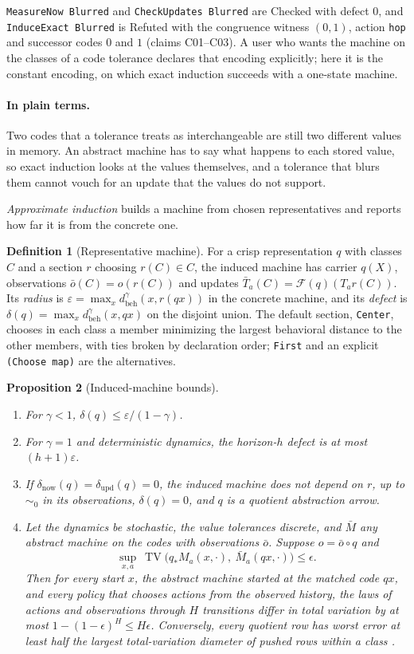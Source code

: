 \documentclass[11pt]{article}
\newcommand{\code}[1]{\texttt{#1}}
\newcommand{\TV}{\operatorname{TV}}
\newcommand{\dnow}{\delta_{\mathrm{now}}}
\newcommand{\dupd}{\delta_{\mathrm{upd}}}
\newcommand{\dbeh}{d_{\mathrm{beh}}}
\newcommand{\plain}{\paragraph{In plain terms.}}
\theoremstyle{definition}
\newtheorem{definition}{Definition}[section]
\theoremstyle{plain}
\newtheorem{proposition}[definition]{Proposition}
\begin{document}
\code{MeasureNow Blurred} and \code{CheckUpdates Blurred} are Checked with defect $0$, and
\code{InduceExact Blurred} is Refuted with the congruence witness $(0,1)$, action \code{hop} and
successor codes $0$ and $1$ (claims C01--C03). A user who wants the machine on the classes of a code
tolerance declares that encoding explicitly; here it is the constant encoding, on which exact
induction succeeds with a one-state machine.

\plain Two codes that a tolerance treats as interchangeable are still two different values in
memory. An abstract machine has to say what happens to each stored value, so exact induction looks
at the values themselves, and a tolerance that blurs them cannot vouch for an update that the values
do not support.

\emph{Approximate induction} builds a machine from chosen representatives and reports how far it
is from the concrete one.

\begin{definition}[Representative machine]\label{def:repmachine}
For a crisp representation $q$ with classes $C$ and a section $r$ choosing $r(C)\in C$, the
induced machine has carrier $q(X)$, observations $\bar o(C)=o(r(C))$ and updates
$\bar T_a(C)=\mathcal F(q)(T_a r(C))$. Its \emph{radius} is
$\varepsilon=\max_x\dbeh^\gamma(x,r(qx))$ in the concrete machine, and its \emph{defect} is
$\delta(q)=\max_x\dbeh^\gamma(x,qx)$ on the disjoint union. The default section, \code{Center},
chooses in each class a member minimizing the largest behavioral distance to the other members,
with ties broken by declaration order; \code{First} and an explicit \code{(Choose map)} are the
alternatives.
\end{definition}

\begin{proposition}[Induced-machine bounds]\label{prop:induce}\mbox{}
\begin{enumerate}
\item For $\gamma<1$, $\delta(q)\le\varepsilon/(1-\gamma)$.
\item For $\gamma=1$ and deterministic dynamics, the horizon-$h$ defect is at most $(h+1)\varepsilon$.
\item If $\dnow(q)=\dupd(q)=0$, the induced machine does not depend on $r$, up to $\sim_0$ in its
observations, $\delta(q)=0$, and $q$ is a quotient abstraction arrow.
\item Let the dynamics be stochastic, the value tolerances discrete, and $\bar M$ any abstract
machine on the codes with observations $\bar o$. Suppose $o=\bar o\circ q$ and
\[
\sup_{x,a}\ \TV\bigl(q_*M_a(x,\cdot),\ \bar M_a(qx,\cdot)\bigr)\le\epsilon .
\]
Then for every start $x$, the abstract machine started at the matched code $qx$, and every policy
that chooses actions from the observed history, the laws of actions and observations through $H$
transitions differ in total variation by at most $1-(1-\epsilon)^H\le H\epsilon$. Conversely, every
quotient row has worst error at least half the largest total-variation diameter of pushed rows
within a class \cite{evolearn}.
\end{enumerate}
\end{proposition}
\end{document}
